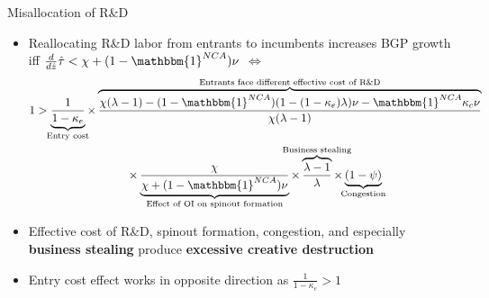\documentclass[english,usenames,dvipsnames,handout]{beamer}
\begin{document}
\begin{frame}{Misallocation of R\&D}\label{misallocation_of_rd}
	\hyperlink{efficiency}{} 
	\begin{itemize}
		\item Reallocating R\&D labor from entrants to incumbents increases BGP growth iff $\frac{d}{d\hat{z}} \hat{\tau} < \chi + (1-\mathbbm{1}^{NCA})\nu$ $\Leftrightarrow$
		\footnotesize
		\begin{multline}
		1 >  \underbrace{\frac{1}{1-\kappa_{e}}}_{\mathclap{\text{Entry cost}}} \times \overbrace{\frac{\chi(\lambda-1) -(1-\mathbbm{1}^{NCA}) (1-(1-\kappa_e)\lambda)\nu - \mathbbm{1}^{NCA} \kappa_c \nu}{\chi(\lambda-1)}}^{\mathclap{\text{Entrants face different effective cost of R\&D}}} \\
		\times \underbrace{\frac{\chi}{\chi + (1-\mathbbm{1}^{NCA})\nu}}_{\mathclap{\text{Effect of OI on spinout formation}}} \times \overbrace{\frac{\lambda-1}{\lambda}}^{\mathclap{\text{Business stealing}}} \times  \underbrace{(1-\psi)}_{\mathclap{\text{Congestion}}} \label{eq:RD_reallocation} 
		\end{multline}
		\normalsize
		\item Effective cost of R\&D, spinout formation, congestion, and especially \alert{\textbf{business stealing}} produce \alert{\textbf{excessive creative destruction}}
		\item Entry cost effect works in opposite direction as $\frac{1}{1-\kappa_e} > 1$
	\end{itemize}
\end{frame}
\end{document}
